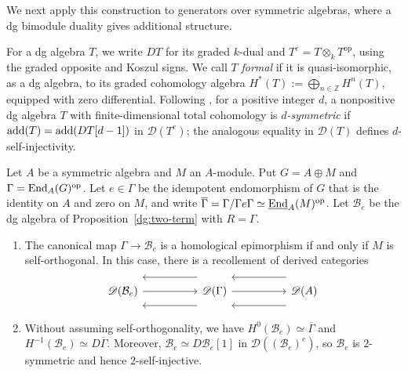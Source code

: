 \documentclass[11pt]{article}
\begin{document}
We next apply this construction to generators over symmetric
algebras, where a dg bimodule duality gives additional structure.

For a dg algebra $T$, we write $DT$ for its graded $k$-dual and
$T^e=T\otimes_kT^{\mathrm{op}}$, using the graded opposite and
Koszul signs. We call $T$ \emph{formal} if it is quasi-isomorphic,
as a dg algebra, to its graded cohomology algebra
$H^*(T):=\bigoplus_{n\in\mathbb Z}H^n(T)$, equipped with zero differential.
Following \cite[Definition~2.2]{Jin}, for a positive
integer $d$, a nonpositive dg algebra $T$ with finite-dimensional total
cohomology is \emph{$d$-symmetric} if ${\rm add}(T)={\rm add}(DT[d-1])$ in $\mathscr D(T^e)$;
the analogous equality in $\mathscr D(T)$ defines $d$-self-injectivity.

\begin{Prop}\label{dg:symmetric-application}
Let $A$ be a symmetric algebra and $M$ an $A$-module.
Put $G=A\oplus M$ and $\Gamma={\rm End}_A(G)^{\mathrm{op}}$.
Let $e\in\Gamma$ be the idempotent endomorphism of $G$
that is the identity on $A$ and zero on $M$, and write
$\overline\Gamma=\Gamma/\Gamma e\Gamma
\simeq\underline{{\rm End}}_A(M)^{\mathrm{op}}$.
Let $\mathcal B_e$ be the dg algebra of
Proposition~\ref{dg:two-term} with $R=\Gamma$.
\begin{enumerate}
\item The canonical map $\Gamma\to\mathcal B_e$ is a homological
epimorphism if and only if $M$ is self-orthogonal. In this case,
there is a recollement of derived categories
\[
\begin{tikzcd}[column sep=5em]
 \mathscr D(\mathcal B_e) \arrow[r]
 & \mathscr D(\Gamma)
   \arrow[l, shift right=3ex]
   \arrow[l, shift left=3ex]
   \arrow[r]
 & \mathscr D(A)
   \arrow[l, shift right=3ex]
   \arrow[l, shift left=3ex]
\end{tikzcd}
\]
\item Without assuming self-orthogonality, we have
$H^0(\mathcal B_e)\simeq\overline\Gamma$ and
$H^{-1}(\mathcal B_e)\simeq D\overline\Gamma$.
Moreover, $\mathcal B_e\simeq D\mathcal B_e[1]$ in
$\mathscr D((\mathcal B_e)^e)$, so $\mathcal B_e$ is $2$-symmetric
and hence $2$-self-injective.
\end{enumerate}
\end{Prop}
\end{document}
